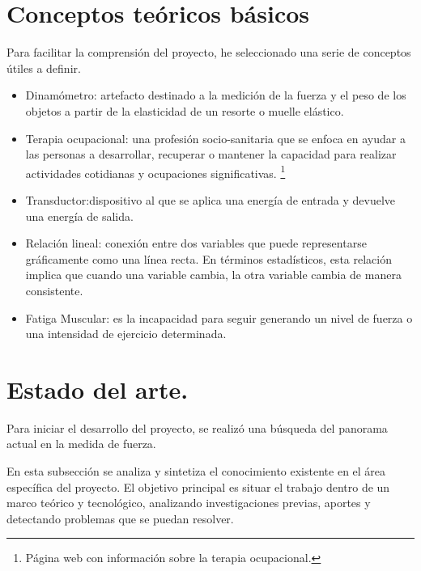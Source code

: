 \section{Conceptos teóricos básicos}
Para facilitar la comprensión del proyecto, he seleccionado una serie de conceptos útiles a definir. 
\begin{itemize}
    \item Dinamómetro: artefacto destinado a la medición de la fuerza y el peso de los objetos a partir de la elasticidad de un resorte o muelle elástico.\cite{Dinamometro}
    \item Terapia ocupacional: una profesión socio-sanitaria que se enfoca en ayudar a las personas a desarrollar, recuperar o mantener la capacidad para realizar actividades cotidianas y ocupaciones significativas. \cite{T.O}\footnote{Página web con información sobre la terapia ocupacional\cite{T.O}.}
    \item Transductor:dispositivo al que se aplica una energía de entrada y devuelve una energía de salida.\cite{celulas_extensométricas}
    \item Relación lineal: conexión entre dos variables que puede representarse gráficamente como una línea recta. En términos estadísticos, esta relación implica que cuando una variable cambia, la otra variable cambia de manera consistente.\cite{LEARN_STATISTICS_EASILY}
    \item Fatiga Muscular: es la incapacidad para seguir generando un nivel de fuerza o una intensidad de ejercicio determinada. \cite{gomez_campos_mecanismos_2010}
\end{itemize}

\section{Estado del arte.}

Para iniciar el desarrollo del proyecto, se realizó una búsqueda del panorama actual en la medida de fuerza. 

En esta subsección se analiza y sintetiza el conocimiento existente en el área específica del proyecto. El objetivo principal es situar el trabajo dentro de un marco teórico y tecnológico, analizando investigaciones previas, aportes y detectando problemas que se puedan resolver.
